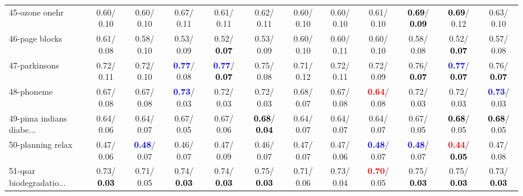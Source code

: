 \begin{table}[h]
\begin{center}
{\begin{tabular}{lc|c|c|c|c|c|c|c|c|c|c}
45-ozone onehr &   0.60/  0.10 &   0.60/  0.10 &   0.67/  0.11 &   0.61/  0.11 &   0.62/  0.11 &   0.60/  0.10 &   0.60/  0.10 &   0.61/  0.10 & \textcolor{black}{\textbf{  0.69}}/\textcolor{black}{\textbf{  0.09}} & \textcolor{black}{\textbf{  0.69}}/  0.12 &   0.63/  0.10 \\
46-page blocks &   0.61/  0.08 &   0.58/  0.10 &   0.53/  0.09 &   0.52/\textcolor{black}{\textbf{  0.07}} &   0.53/  0.09 &   0.60/  0.10 &   0.60/  0.11 &   0.60/  0.10 &   0.58/  0.08 &   0.52/\textcolor{black}{\textbf{  0.07}} &   0.57/  0.08 \\ \hline
47-parkinsons &   0.72/  0.11 &   0.72/  0.10 & \textcolor{blue}{\textbf{  0.77}}/  0.08 & \textcolor{blue}{\textbf{  0.77}}/\textcolor{black}{\textbf{  0.07}} &   0.75/  0.08 &   0.71/  0.12 &   0.72/  0.11 &   0.72/  0.09 &   0.76/\textcolor{black}{\textbf{  0.07}} & \textcolor{blue}{\textbf{  0.77}}/\textcolor{black}{\textbf{  0.07}} &   0.76/\textcolor{black}{\textbf{  0.07}} \\
48-phoneme &   0.67/  0.08 &   0.67/  0.08 & \textcolor{blue}{\textbf{  0.73}}/  0.03 &   0.72/  0.03 &   0.72/  0.03 &   0.68/  0.07 &   0.67/  0.08 & \textcolor{red}{\textbf{  0.64}}/  0.08 &   0.72/  0.03 &   0.72/  0.03 & \textcolor{blue}{\textbf{  0.73}}/  0.03 \\
49-pima indians diabe... &   0.64/  0.06 &   0.64/  0.07 &   0.67/  0.05 &   0.67/  0.06 & \textcolor{black}{\textbf{  0.68}}/\textcolor{black}{\textbf{  0.04}} &   0.64/  0.07 &   0.64/  0.07 &   0.64/  0.07 &   0.67/  0.05 & \textcolor{black}{\textbf{  0.68}}/  0.05 & \textcolor{black}{\textbf{  0.68}}/  0.05 \\
50-planning relax &   0.47/  0.06 & \textcolor{blue}{\textbf{  0.48}}/  0.07 &   0.46/  0.07 &   0.47/  0.09 &   0.46/  0.07 &   0.47/  0.07 &   0.47/  0.06 & \textcolor{blue}{\textbf{  0.48}}/  0.07 & \textcolor{blue}{\textbf{  0.48}}/  0.07 & \textcolor{red}{\textbf{  0.44}}/\textcolor{black}{\textbf{  0.05}} &   0.47/  0.08 \\
51-qsar biodegradatio... &   0.73/\textcolor{black}{\textbf{  0.03}} &   0.71/  0.05 &   0.74/\textcolor{black}{\textbf{  0.03}} &   0.74/\textcolor{black}{\textbf{  0.03}} &   0.75/\textcolor{black}{\textbf{  0.03}} &   0.71/  0.06 &   0.73/  0.04 & \textcolor{red}{\textbf{  0.70}}/  0.05 &   0.75/\textcolor{black}{\textbf{  0.03}} &   0.75/\textcolor{black}{\textbf{  0.03}} &   0.73/\textcolor{black}{\textbf{  0.03}} \\

\end{tabular}}
\end{center}
\end{table}
